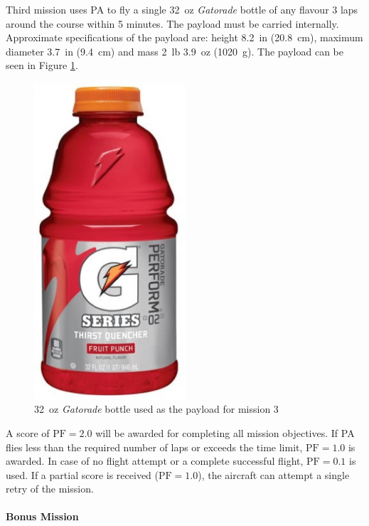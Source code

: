 Third mission uses PA to fly a single \SI{32}{oz} \textit{Gatorade} bottle of any flavour 3 laps around the course within 5 minutes. The payload must be carried internally. Approximate specifications of the payload are: height \SI{8.2}{in} (\SI{20.8}{\centi\meter}), maximum diameter \SI{3.7}{in} (\SI{9.4}{\centi\meter}) and mass \SI{2}{lb} \SI{3.9}{oz} (\SI{1020}{\gram}). The payload can be seen in Figure \ref{fig:gatorade}.
%
\begin{figure}[h]
    \centering
    \includegraphics[angle=270, width=0.5\textwidth]{gatorade.jpg}
    \caption{\SI{32}{oz} \textit{Gatorade} bottle used as the payload for mission 3}
    \label{fig:gatorade}
\end{figure}
%
A score of $\text{PF} = 2.0$ will be awarded for completing all mission objectives. If PA flies less than the required number of laps or exceeds the time limit, $\text{PF} = 1.0$ is awarded. In case of no flight attempt or a complete successful flight, $\text{PF} = 0.1$ is used.  If a partial score is received ($\text{PF} = 1.0$), the aircraft can attempt a single retry of the mission. 

\paragraph{Bonus Mission}

